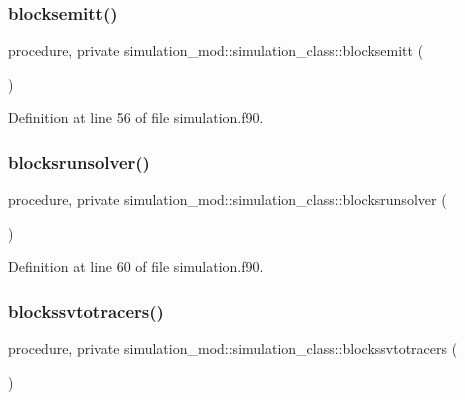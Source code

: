 \subsubsection{\texorpdfstring{blocksemitt()}{blocksemitt()}}
{\footnotesize\ttfamily procedure, private simulation\+\_\+mod\+::simulation\+\_\+class\+::blocksemitt (\begin{DoxyParamCaption}{ }\end{DoxyParamCaption})\hspace{0.3cm}{\ttfamily [private]}}



Definition at line 56 of file simulation.\+f90.

\mbox{\label{structsimulation__mod_1_1simulation__class_aa4e34759252b0517c37c79c95ece1167}} 
\subsubsection{\texorpdfstring{blocksrunsolver()}{blocksrunsolver()}}
{\footnotesize\ttfamily procedure, private simulation\+\_\+mod\+::simulation\+\_\+class\+::blocksrunsolver (\begin{DoxyParamCaption}{ }\end{DoxyParamCaption})\hspace{0.3cm}{\ttfamily [private]}}



Definition at line 60 of file simulation.\+f90.

\mbox{\label{structsimulation__mod_1_1simulation__class_a3d1841e43f69c4e5c705244c080af873}} 
\subsubsection{\texorpdfstring{blockssvtotracers()}{blockssvtotracers()}}
{\footnotesize\ttfamily procedure, private simulation\+\_\+mod\+::simulation\+\_\+class\+::blockssvtotracers (\begin{DoxyParamCaption}{ }\end{DoxyParamCaption})\hspace{0.3cm}{\ttfamily [private]}}



